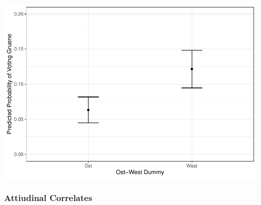 \documentclass[
]{article}
\begin{document}
\includegraphics{AVCD_Final_Assignment-Edenhofer_files/figure-latex/gruene-ost-west-1.pdf}

\hypertarget{attiudinal-correlates-1}{%
\subsubsection{Attiudinal Correlates}\label{attiudinal-correlates-1}}
\end{document}
